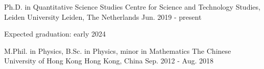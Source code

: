 

\begin{cventries}

  \cventry
    {Ph.D. in Quantitative Science Studies} %
    {Centre for Science and Technology Studies, Leiden University} %
    {Leiden, The Netherlands} %
    {Jun. 2019 - present} %
    {
      \begin{cvitems} %
        \item {Expected graduation: early 2024}
      \end{cvitems}
    }

  \cventry
    {M.Phil. in Physics, B.Sc. in Physics, minor in Mathematics} %
    {The Chinese University of Hong Kong} %
    {Hong Kong, China} %
    {Sep. 2012 - Aug. 2018} %
    {}


\end{cventries}
